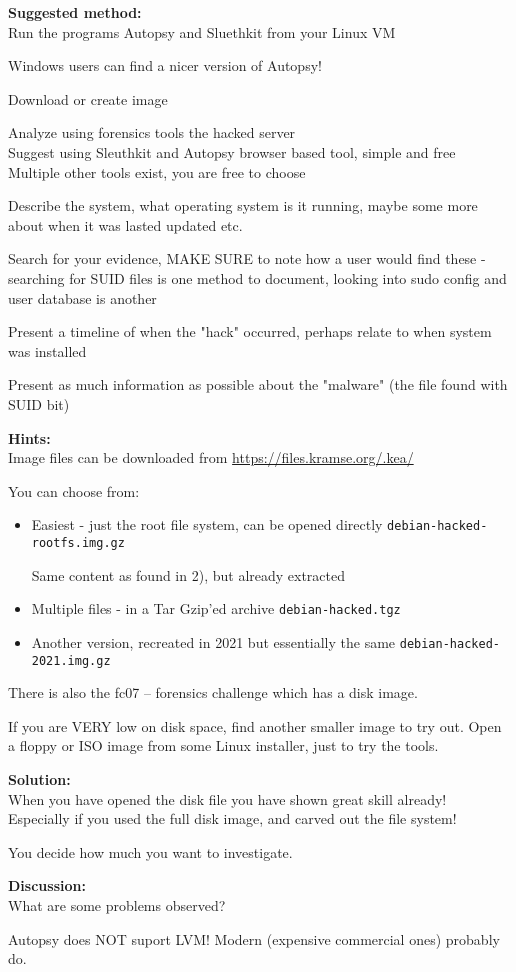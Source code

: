 \documentclass[a4paper,11pt,notitlepage]{report}
\begin{document}
{\bf Suggested method:}\\
Run the programs Autopsy and Sluethkit from your Linux VM

Windows users can find a nicer version of Autopsy!

\begin{list2}
\item Download or create image
\item Analyze using forensics tools the hacked server\\
Suggest using Sleuthkit and Autopsy browser based tool, simple and free\\
Multiple other tools exist, you are free to choose
\item Describe the system, what operating system is it running, maybe some more about when it was lasted updated etc.
\item Search for your evidence, MAKE SURE to note how a user would find these - searching for SUID files is one method to document, looking into sudo config and user database is another
\item Present a timeline of when the "hack" occurred, perhaps relate to when system was installed
\item Present as much information as possible about the "malware" (the file found with SUID bit)
\end{list2}




{\bf Hints:}\\
Image files can be downloaded from \url{https://files.kramse.org/.kea/}

You can choose from:

\begin{itemize}
\item Easiest - just the root file system, can be opened directly
 \verb+debian-hacked-rootfs.img.gz+

Same content as found in 2), but already extracted

\item Multiple files - in a Tar Gzip'ed archive
\verb+debian-hacked.tgz+

\item Another version, recreated in 2021 but essentially the same
\verb+debian-hacked-2021.img.gz+
\end{itemize}

There is also the fc07 -- forensics challenge which has a disk image.

If you are VERY low on disk space, find another smaller image to try out. Open a floppy or ISO image from some Linux installer, just to try the tools.

{\bf Solution:}\\
When you have opened the disk file you have shown great skill already! Especially if you used the full disk image, and carved out the file system!

You decide how much you want to investigate.

{\bf Discussion:}\\
What are some problems observed?

Autopsy does NOT suport LVM! Modern (expensive commercial ones) probably do.
\end{document}
